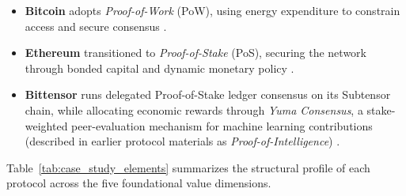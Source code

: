 \documentclass[12pt]{article}
\begin{document}
\begin{itemize}
    \item \textbf{Bitcoin} adopts \textit{Proof-of-Work} (PoW), using energy expenditure to constrain access and secure consensus \citep{nakamoto2008bitcoin, gans2019economics}.
    \item \textbf{Ethereum} transitioned to \textit{Proof-of-Stake} (PoS), securing the network through bonded capital and dynamic monetary policy \citep{buterin2022proof, schar2021defi}.
    \item \textbf{Bittensor} runs delegated Proof-of-Stake ledger consensus on its Subtensor chain, while allocating economic rewards through \textit{Yuma Consensus}, a stake-weighted peer-evaluation mechanism for machine learning contributions (described in earlier protocol materials as \textit{Proof-of-Intelligence}) \citep{rao2023bittensor}.
\end{itemize}

Table~\ref{tab:case_study_elements} summarizes the structural profile of each protocol across the five foundational value dimensions.
\end{document}
